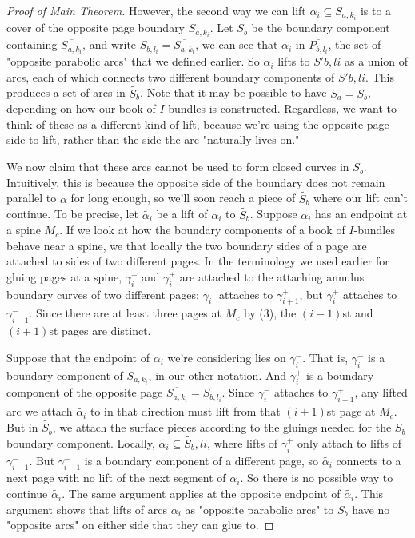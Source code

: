 \documentclass[12pt]{amsart}
\theoremstyle{definition}
\theoremstyle{remark}
\newcommand{\cin}{\subseteq}
\begin{document}
\begin{proof}[Proof of Main Theorem]
However, the second way we can lift $\alpha_i \cin S_{a,k_i}$ is to a cover of the
opposite page boundary $\overline{S_{a,k_i}}$. Let $S_b$ be the boundary component
containing $\overline{S_{a,k_i}}$, and write $S_{b,l_i} = \overline{S_{a,k_i}}$, we can see that $\alpha_i$
in $\overline{P_{b,l_i}}$, the set of "opposite parabolic arcs" that we defined earlier.
So $\alpha_i$ lifts to $S'b,li$ as a union of arcs, each of which connects two
different boundary components of $S'b,li$. This produces a set of arcs in
$\widetilde{S_b}$. Note that it may be possible to have $S_a = S_b$, depending on
how our book of $I$-bundles is constructed.  Regardless, we want to think of
these as a different kind of lift, because we're using the opposite page side
to lift, rather than the side the arc "naturally lives on."

We now claim that these arcs cannot be used to form closed curves in $\widetilde{S_b}$.
Intuitively, this is because the opposite side of the boundary does not remain
parallel to $\alpha$ for long enough, so we'll soon reach a piece of $\widetilde{S_b}$
where our lift can't continue.  To be precise, let $\widetilde{\alpha_i}$ be a lift of
$\alpha_i$ to $\widetilde{S_b}$.  Suppose $\alpha_i$ has an endpoint at a spine $M_c$. If we
look at how the boundary components of a book of $I$-bundles behave near
a spine, we that locally the two boundary sides of a page are attached to sides
of two different pages.  In the terminology we used earlier for gluing pages at
a spine, $\gamma_i^-$ and $\gamma_i^+$ are attached to the attaching annulus boundary
curves of two different pages: $\gamma_i^-$ attaches to $\gamma_{i+1}^+$, but
$\gamma_i^+$ attaches to $\gamma_{i-1}^-$.  Since there are at least three pages at
$M_c$ by (3), the $(i-1)$st and $(i+1)$st pages are distinct.

Suppose that the endpoint of $\alpha_i$ we're considering lies on $\gamma_i^-$. That
is, $\gamma_i^-$ is a boundary component of $S_{a,k_i}$, in our other notation. And
$\gamma_i^+$ is a boundary component of the opposite page $\overline{S_{a,k_i}} = S_{b,l_i}$.
Since $\gamma_i^-$ attaches to $\gamma_{i+1}^+$, any lifted arc we attach
$\widetilde{\alpha_i}$ to in that direction must lift from that $(i+1)$st page at $M_c$.
But in $\widetilde{S_b}$, we attach the surface pieces according to the gluings needed
for the $S_b$ boundary component.  Locally, $\widetilde{\alpha_i} \cin \widetilde{S_b},li$, where
lifts of $\gamma_i^+$ only attach to lifts of $\gamma_{i-1}^-$. But $\gamma_{i-1}^-$ is
a boundary component of a different page, so $\widetilde{\alpha_i}$ connects to a next
page with no lift of the next segment of $\alpha_i$. So there is no possible way
to continue $\widetilde{\alpha_i}$.  The same argument applies at the opposite endpoint
of $\widetilde{\alpha_i}$. This argument shows that lifts of arcs $\alpha_i$ as "opposite
parabolic arcs" to $S_b$ have no "opposite arcs" on either side that they can
glue to.


\end{proof}
\end{document}
